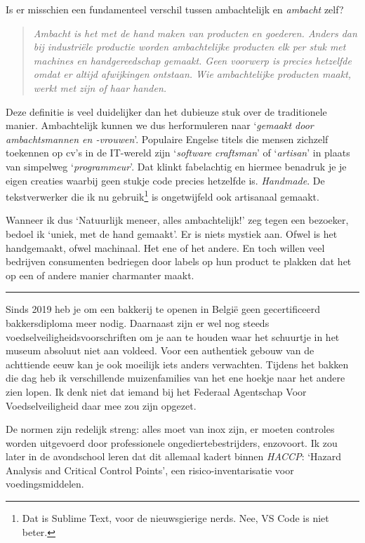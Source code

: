 \documentclass[
  11pt,
  dutch,
]{memoir}
\begin{document}
Is er misschien een fundamenteel verschil tussen ambachtelijk en
\emph{ambacht} zelf?

\begin{quote}
\emph{Ambacht is het met de hand maken van producten en goederen. Anders
dan bij industriële productie worden ambachtelijke producten elk per
stuk met machines en handgereedschap gemaakt. Geen voorwerp is precies
hetzelfde omdat er altijd afwijkingen ontstaan. Wie ambachtelijke
producten maakt, werkt met zijn of haar handen.}
\end{quote}

Deze definitie is veel duidelijker dan het dubieuze stuk over de
traditionele manier. Ambachtelijk kunnen we dus herformuleren naar
`\emph{gemaakt door ambachtsmannen en -vrouwen}'. Populaire Engelse
titels die mensen zichzelf toekennen op cv's in de IT-wereld zijn
`\emph{software craftsman}' of `\emph{artisan}' in plaats van simpelweg
`\emph{programmeur}'. Dat klinkt fabelachtig en hiermee benadruk je je
eigen creaties waarbij geen stukje code precies hetzelfde is.
\emph{Handmade}. De tekstverwerker die ik nu gebruik\footnote{Dat is
  Sublime Text, voor de nieuwsgierige nerds. Nee, VS Code is niet beter.}
is ongetwijfeld ook artisanaal gemaakt.

Wanneer ik dus `Natuurlijk meneer, alles ambachtelijk!' zeg tegen een
bezoeker, bedoel ik `uniek, met de hand gemaakt'. Er is niets mystiek
aan. Ofwel is het handgemaakt, ofwel machinaal. Het ene of het andere.
En toch willen veel bedrijven consumenten bedriegen door labels op hun
product te plakken dat het op een of andere manier charmanter maakt.

\pfbreak

Sinds 2019 heb je om een bakkerij te openen in België geen
gecertificeerd bakkersdiploma meer nodig. Daarnaast zijn er wel nog
steeds voedselveiligheidsvoorschriften om je aan te houden waar het
schuurtje in het museum absoluut niet aan voldeed. Voor een authentiek
gebouw van de achttiende eeuw kan je ook moeilijk iets anders
verwachten. Tijdens het bakken die dag heb ik verschillende
muizenfamilies van het ene hoekje naar het andere zien lopen. Ik denk
niet dat iemand bij het Federaal Agentschap Voor Voedselveiligheid daar
mee zou zijn opgezet.

De normen zijn redelijk streng: alles moet van inox zijn, er moeten
controles worden uitgevoerd door professionele ongediertebestrijders,
enzovoort. Ik zou later in de avondschool leren dat dit allemaal kadert
binnen \emph{HACCP}: `Hazard Analysis and Critical Control Points', een
risico-inventarisatie voor voedingsmiddelen.
\end{document}
